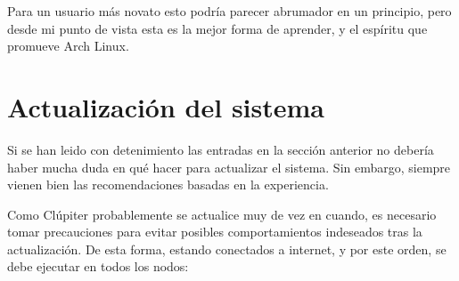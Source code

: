 Para un usuario más novato esto podría parecer abrumador en un principio, pero desde mi punto de vista esta es la mejor forma de aprender, y el espíritu que promueve Arch Linux. 

\section{Actualización del sistema}
Si se han leido con detenimiento las entradas en la sección anterior no debería haber mucha duda en qué hacer para actualizar el sistema. Sin embargo, siempre vienen bien las recomendaciones basadas en la experiencia.

Como Clúpiter probablemente se actualice muy de vez en cuando, es necesario tomar precauciones para evitar posibles comportamientos indeseados tras la actualización. De esta forma, estando conectados a internet, y por este orden, se debe ejecutar en todos los nodos:

